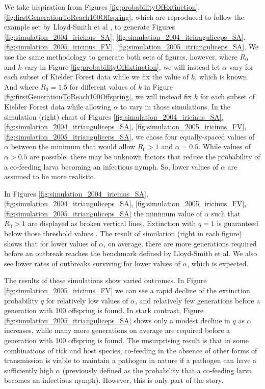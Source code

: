 \documentclass{article}
\begin{document}
We take inspiration from Figures \ref{fig:probabilityOfExtinction}, \ref{fig:firstGenerationToReach100Offspring}, which are reproduced to follow the example set by Lloyd-Smith et al \cite{LloydSmith2005}, to generate Figures \ref{fig:simulation_2004_iricinus_SA}, \ref{fig:simulation_2004_itrianguliceps_SA}, \ref{fig:simulation_2005_iricinus_FV}, \ref{fig:simulation_2005_itrianguliceps_SA}. We use the same methodology to generate both sets of figures, however, where $ R_0 $ and $ k $ vary in Figure \ref{fig:probabilityOfExtinction}, we will instead let $ \alpha $ vary for each subset of Kielder Forest data while we fix the value of $ k $, which is known. And where $ R_0=1.5 $ for different values of $ k $ in Figure \ref{fig:firstGenerationToReach100Offspring}, we will instead fix $ k $ for each subset of Kielder Forest data while allowing $ \alpha $ to vary in those simulations. In the simulation (right) chart of Figures \ref{fig:simulation_2004_iricinus_SA}, \ref{fig:simulation_2004_itrianguliceps_SA}, \ref{fig:simulation_2005_iricinus_FV}, \ref{fig:simulation_2005_itrianguliceps_SA}, we chose four equally-spaced values of $ \alpha $ between the minimum that would allow $ R_0 > 1 $ and $ \alpha=0.5 $. While values of $ \alpha > 0.5 $ are possible, there may be unknown factors that reduce the probability of a co-feeding larva becoming an infectious nymph. So, lower values of $ \alpha $ are assumed to be more realistic. 

In Figures \ref{fig:simulation_2004_iricinus_SA}, \ref{fig:simulation_2004_itrianguliceps_SA}, \ref{fig:simulation_2005_iricinus_FV}, \ref{fig:simulation_2005_itrianguliceps_SA} the minimum value of $ \alpha $ such that $ R_0 > 1 $ are displayed as broken vertical lines. Extinction with $ q=1 $ is guaranteed below those threshold values . The result of simulation (right in each figure) shows that for lower values of $ \alpha $, on average, there are more generations required before an outbreak reaches the benchmark defined by Lloyd-Smith et al. We also see lower rates of outbreaks surviving for lower values of $ \alpha $, which is expected.

The results of these simulations show varied outcomes. In Figure \ref{fig:simulation_2005_iricinus_FV} we can see a rapid decline of the extinction probability $ q $ for relatively low values of $ \alpha $, and relatively few generations before a generation with 100 offspring is found. In stark contrast, Figure \ref{fig:simulation_2005_itrianguliceps_SA} shows only a modest decline in $ q $ as $ \alpha $ increases, while many more generations on average are required before a generation with 100 offspring is found. The unsurprising result is that in some combinations of tick and host species, co-feeding in the absence of other forms of transmission is viable to maintain a pathogen in nature if a pathogen can have a sufficiently high $ \alpha $ (previously defined as the probability that a co-feeding larva becomes an infectious nymph). However, this is only part of the story.
\end{document}
